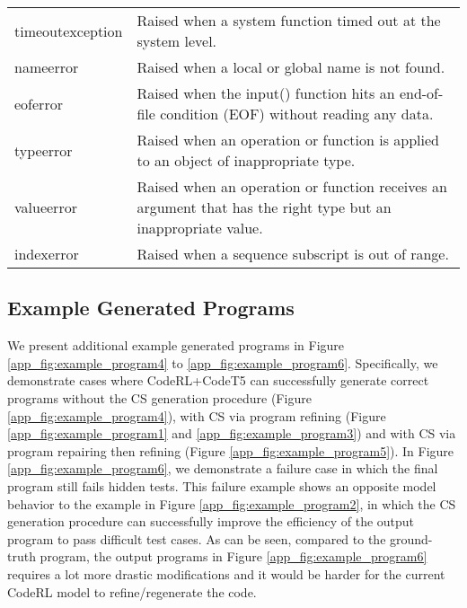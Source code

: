 \documentclass{article}
\begin{document}
\begin{table}[t]
\begin{tabular}{p{}p{}}
timeoutexception  & Raised when a system function timed out at the system level.                                                                                               \\
nameerror         & Raised when a local or global name is not found.                                                                                                           \\
eoferror          & Raised when the input() function hits an end-of-file condition (EOF) without reading any data.                                                             \\
typeerror         & Raised when an operation or function is applied to an object of inappropriate type.                                                                        \\
valueerror        & Raised when an operation or function receives an argument that has the right type but an inappropriate value.                                              \\
indexerror        & Raised when a sequence subscript is out of range.                                                                           \\
\hline
\end{tabular}
\end{table} 

\subsection{Example Generated Programs} 
\label{app_sec:example_programs}

We present additional example generated programs in Figure \ref{app_fig:example_program4} to \ref{app_fig:example_program6}.
Specifically, we demonstrate cases where CodeRL+CodeT5 can successfully generate correct programs without the CS generation procedure (Figure \ref{app_fig:example_program4}), with CS via program refining (Figure \ref{app_fig:example_program1} and \ref{app_fig:example_program3}) and with CS via program repairing then refining (Figure \ref{app_fig:example_program5}).
In Figure \ref{app_fig:example_program6}, we demonstrate a failure case in which the final program still fails hidden tests. 
This failure example shows an opposite model behavior to the example in Figure \ref{app_fig:example_program2}, in which the CS generation procedure can successfully improve the efficiency of the output program to pass difficult test cases. 
As can be seen, compared to the ground-truth program, the output programs in Figure \ref{app_fig:example_program6} requires a lot more drastic modifications and it would be harder for the current CodeRL model to refine/regenerate the code. 
\end{document}
